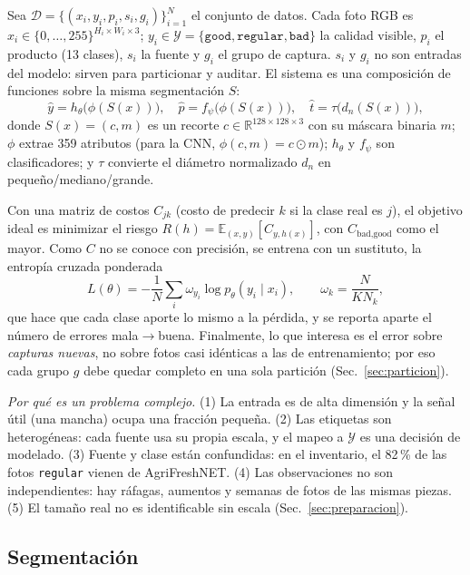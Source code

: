 \documentclass[conference]{IEEEtran}
\newcommand{\cls}[1]{\texttt{#1}}
\newcommand{\mb}{mala$\to$buena}
\begin{document}
Sea $\mathcal{D}=\{(x_i,y_i,p_i,s_i,g_i)\}_{i=1}^{N}$ el conjunto de datos. Cada foto RGB es $x_i\in\{0,\dots,255\}^{H_i\times W_i\times 3}$; $y_i\in\mathcal{Y}=\{\cls{good},\cls{regular},\cls{bad}\}$ la calidad visible, $p_i$ el producto (13 clases), $s_i$ la fuente y $g_i$ el grupo de captura. $s_i$ y $g_i$ no son entradas del modelo: sirven para particionar y auditar. El sistema es una composición de funciones sobre la misma segmentación $S$:
\begin{equation}
\hat y=h_\theta\big(\phi(S(x))\big),\quad
\hat p=f_\psi\big(\phi(S(x))\big),\quad
\hat t=\tau\big(d_n(S(x))\big),
\label{eq:sistema}
\end{equation}
donde $S(x)=(c,m)$ es un recorte $c\in\mathbb{R}^{128\times128\times3}$ con su máscara binaria $m$; $\phi$ extrae 359 atributos (para la CNN, $\phi(c,m)=c\odot m$); $h_\theta$ y $f_\psi$ son clasificadores; y $\tau$ convierte el diámetro normalizado $d_n$ en pequeño/mediano/grande.

Con una matriz de costos $C_{jk}$ (costo de predecir $k$ si la clase real es $j$), el objetivo ideal es minimizar el riesgo $R(h)=\mathbb{E}_{(x,y)}[C_{y,h(x)}]$, con $C_{\text{bad},\text{good}}$ como el mayor. Como $C$ no se conoce con precisión, se entrena con un sustituto, la entropía cruzada ponderada
\begin{equation}
L(\theta)=-\frac{1}{N}\sum_i \omega_{y_i}\log p_\theta(y_i\mid x_i),\qquad
\omega_k=\frac{N}{K N_k},
\label{eq:perdida}
\end{equation}
que hace que cada clase aporte lo mismo a la pérdida, y se reporta aparte el número de errores \mb. Finalmente, lo que interesa es el error sobre \emph{capturas nuevas}, no sobre fotos casi idénticas a las de entrenamiento; por eso cada grupo $g$ debe quedar completo en una sola partición (Sec.~\ref{sec:particion}).

\emph{Por qué es un problema complejo.} (1) La entrada es de alta dimensión y la señal útil (una mancha) ocupa una fracción pequeña. (2) Las etiquetas son heterogéneas: cada fuente usa su propia escala, y el mapeo a $\mathcal{Y}$ es una decisión de modelado. (3) Fuente y clase están confundidas: en el inventario, el 82\,\% de las fotos \cls{regular} vienen de AgriFreshNET. (4) Las observaciones no son independientes: hay ráfagas, aumentos y semanas de fotos de las mismas piezas. (5) El tamaño real no es identificable sin escala (Sec.~\ref{sec:preparacion}).

\subsection{Segmentación}
\end{document}
